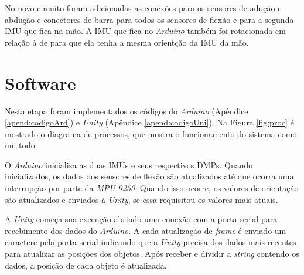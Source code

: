 \begin{figure}[ht!]
  \captionsetup{justification=centering}
  \label{fig:shield}
\end{figure}

No novo circuito foram adicionadas as conexões para os sensores de adução e abdução e conectores de barra para todos os sensores de flexão e para a segunda \ac{IMU} que fica na mão. A \ac{IMU} que fica no \textit{Arduino} também foi rotacionada em relação à de  para que ela tenha a mesma orientção da \ac{IMU} da mão.


\section{Software} %
\label{sec:met_software}
Nesta etapa foram implementados os códigos do \textit{Arduino} (Apêndice \ref{apend:codigoArd}) e \textit{Unity} (Apêndice \ref{apend:codigoUni}). Na Figura \ref{fig:proc} é mostrado o diagrama de processos, que mostra o funcionamento do sistema como um todo.

O \textit{Arduino} inicializa as duas \ac{IMU}s e seus respectivos \ac{DMP}s. Quando inicializados, os dados dos sensores de flexão são atualizados até que ocorra uma interrupção por parte da \textit{MPU-9250}. Quando isso ocorre, os valores de orientação são atualizados e enviados à \textit{Unity}, se essa requisitou os valores mais atuais.

A \textit{Unity} começa sua execução abrindo uma conexão com a porta serial para recebimento dos dados do \textit{Arduino}. A cada atualização de \textit{frame} é enviado um caractere pela porta serial indicando que a \textit{Unity} precisa dos dados mais recentes para atualizar as posições dos objetos. Após receber e dividir a \textit{string} contendo os dados, a posição de cada objeto é atualizada. 

